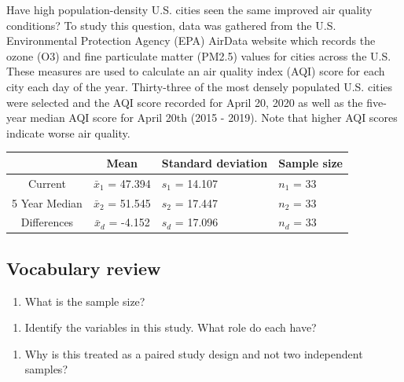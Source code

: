 \documentclass[
]{report}
\providecommand{\tightlist}{%
  \setlength{\itemsep}{0pt}\setlength{\parskip}{0pt}}
\begin{document}
Have high population-density U.S. cities seen the same improved air quality conditions? To study this question, data was gathered from the U.S. Environmental Protection Agency (EPA) AirData website which records the ozone (O3) and fine particulate matter (PM2.5) values for cities across the U.S. These measures are used to calculate an air quality index (AQI) score for each city each day of the year. Thirty-three of the most densely populated U.S. cities were selected and the AQI score recorded for April 20, 2020 as well as the five-year median AQI score for April 20th (2015 - 2019). Note that higher AQI scores indicate worse air quality.

\begin{longtable}[]{@{}ccll@{}}
\toprule
& Mean & Standard deviation & Sample size\tabularnewline
\midrule
\endhead
Current & \(\bar{x}_1\) = 47.394 & \(s_1\) = 14.107 & \(n_1\) = 33\tabularnewline
5 Year Median & \(\bar{x}_2\) = 51.545 & \(s_2\) = 17.447 & \(n_2\) = 33\tabularnewline
Differences & \(\bar{x}_d\) = -4.152 & \(s_d\) = 17.096 & \(n_d\) = 33\tabularnewline
\bottomrule
\end{longtable}

\newpage

\hypertarget{vocabulary-review}{%
\subsection*{Vocabulary review}\label{vocabulary-review}}

\begin{enumerate}
\def\labelenumi{\arabic{enumi}.}
\tightlist
\item
  What is the sample size?
\end{enumerate}

\vspace{0.5in}

\begin{enumerate}
\def\labelenumi{\arabic{enumi}.}
\setcounter{enumi}{1}
\tightlist
\item
  Identify the variables in this study. What role do each have?
\end{enumerate}

\vspace{.8in}

\begin{enumerate}
\def\labelenumi{\arabic{enumi}.}
\setcounter{enumi}{2}
\tightlist
\item
  Why is this treated as a paired study design and not two independent samples?
\end{enumerate}
\end{document}
